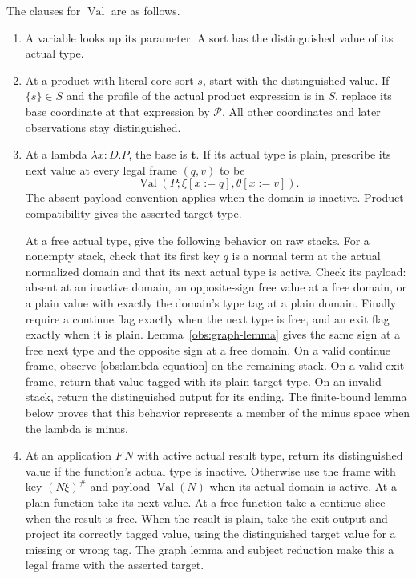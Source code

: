 The clauses for $\operatorname{Val}$ are as follows.
\begin{enumerate}
\item A variable looks up its parameter.  A sort has the distinguished
      value of its actual type.
\item At a product with literal core sort $s$, start with the
      distinguished value.  If $\{s\}\in S$ and the profile of the
      actual product expression is in $S$, replace its base coordinate
      at that expression by $\mathcal P$.  All other coordinates and
      later observations stay distinguished.
\item At a lambda $\lambda x:D.P$, the base is $\mathbf t$.
      If its actual type is plain, prescribe its next value at every
      legal frame $(q,v)$ to be
      \begin{equation}\label{obs:lambda-equation}
       \operatorname{Val}(P;\xi[x:=q],\theta[x:=v]).
      \end{equation}
      The absent-payload convention applies when the domain is
      inactive.  Product compatibility gives the asserted target type.

      At a free actual type, give the following behavior on raw stacks.
      For a nonempty stack, check that its first key $q$ is a normal
      term at the actual normalized domain and that its next actual
      type is active.  Check its payload: absent at an inactive domain,
      an opposite-sign free value at a free domain, or a plain value
      with exactly the domain's type tag at a plain domain.  Finally
      require a continue flag exactly when the next type is free, and
      an exit flag exactly when it is plain.  Lemma~\ref{obs:graph-lemma}
      gives the same sign at a free next type and the opposite sign at
      a free domain.  On a valid continue frame, observe
      \eqref{obs:lambda-equation} on the remaining stack.  On a valid
      exit frame, return that value tagged with its plain target type.
      On an invalid stack, return the distinguished output for its
      ending.  The finite-bound lemma below proves that this behavior
      represents a member of the minus space when the lambda is minus.
\item At an application $F\,N$ with active actual result type, return
      its distinguished value if the function's actual type is
      inactive.  Otherwise use the frame with key $(N\xi)^\#$ and
      payload $\operatorname{Val}(N)$ when its actual domain is active.
      At a plain function take its next value.  At a free function take
      a continue slice when the result is free.  When the result is
      plain, take the exit output and project its correctly tagged
      value, using the distinguished target value for a missing or
      wrong tag.  The graph lemma and subject reduction make this a
      legal frame with the asserted target.
\end{enumerate}

